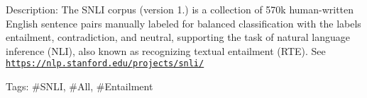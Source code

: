 Description\+: The S\+N\+LI corpus (version 1.) is a collection of 570k human-\/written English sentence pairs manually labeled for balanced classification with the labels entailment, contradiction, and neutral, supporting the task of natural language inference (N\+LI), also known as recognizing textual entailment (R\+TE). See \href{https://nlp.stanford.edu/projects/snli/}{\tt https\+://nlp.\+stanford.\+edu/projects/snli/}

Tags\+: \#\+S\+N\+LI, \#\+All, \#\+Entailment 